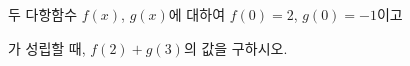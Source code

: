 두 다항함수 $f(x)$, $g(x)$에 대하여 $f(0)=2$, $g(0)=-1$이고 \par\smallskip{}\par\smallskip\noindent 가 성립할 때, $f(2)+g(3)$의 값을 구하시오.
